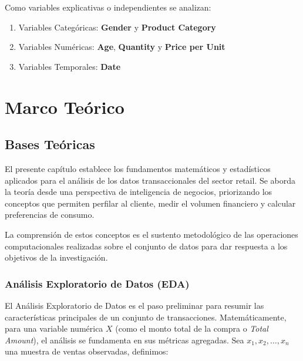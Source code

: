 \documentclass[oneside,11pt]{Latex/Classes/PhDthesisPSnPDF}
\begin{document}
Como variables explicativas o independientes se analizan:

\begin{enumerate}
    \item Variables Categóricas: \textbf{Gender} y \textbf{Product Category}
    \item Variables Numéricas: \textbf{Age}, \textbf{Quantity} y \textbf{Price per Unit}
    \item Variables Temporales: \textbf{Date}
\end{enumerate}

\chapter{Marco Teórico}

\section{Bases Teóricas}

El presente capítulo establece los fundamentos matemáticos y
estadísticos aplicados para el análisis de los datos transaccionales del
sector retail. Se aborda la teoría desde una perspectiva de inteligencia
de negocios, priorizando los conceptos que permiten perfilar al cliente,
medir el volumen financiero y calcular preferencias de consumo.

La comprensión de estos conceptos es el sustento metodológico de las
operaciones computacionales realizadas sobre el conjunto de datos para
dar respuesta a los objetivos de la investigación.

\subsection{Análisis Exploratorio de Datos (EDA)}

El Análisis Exploratorio de Datos es el paso preliminar para resumir las
características principales de un conjunto de transacciones.
Matemáticamente, para una variable numérica \(X\) (como el monto total
de la compra o \textit{Total Amount}), el análisis se fundamenta en sus
métricas agregadas. Sea \(x_1, x_2, \dots, x_n\) una muestra de ventas
observadas, definimos:
\end{document}
